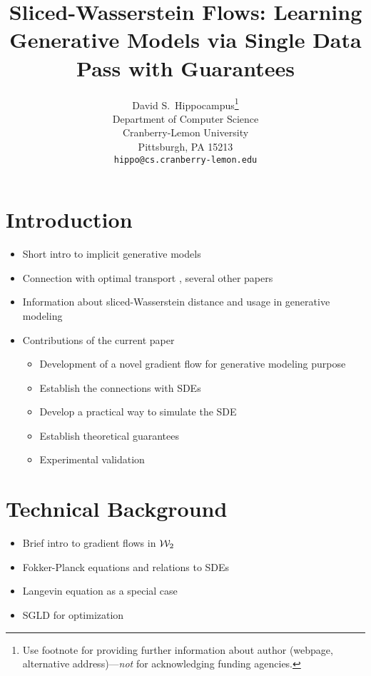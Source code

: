 \documentclass{article}
\title{Sliced-Wasserstein Flows: Learning Generative Models via Single Data Pass with Guarantees}
\author{
  David S.~Hippocampus\thanks{Use footnote for providing further
    information about author (webpage, alternative
    address)---\emph{not} for acknowledging funding agencies.} \\
  Department of Computer Science\\
  Cranberry-Lemon University\\
  Pittsburgh, PA 15213 \\
  \texttt{hippo@cs.cranberry-lemon.edu} \\
}
\newcommand{\W}{{\cal W}_2}
\begin{document}

\maketitle

\begin{abstract}

\end{abstract}

\section{Introduction}

\begin{itemize}
\item Short intro to implicit generative models
\item Connection with optimal transport \cite{genevay2017gan}, several other papers
\item Information about sliced-Wasserstein distance and usage in generative modeling \cite{bonnotte2013unidimensional,kolouri2018sliced,wu2017generative}
\item Contributions of the current paper
\begin{itemize}
\item Development of a novel gradient flow for generative modeling purpose
\item Establish the connections with SDEs
\item Develop a practical way to simulate the SDE
\item Establish theoretical guarantees
\item Experimental validation
\end{itemize}
\end{itemize}

\section{Technical Background}

\begin{itemize}
\item Brief intro to gradient flows in $\W$ 
\item Fokker-Planck equations and relations to SDEs
\item Langevin equation as a special case
\item SGLD for optimization \cite{raginsky17a,zhang17b}
\end{itemize}
\end{document}
